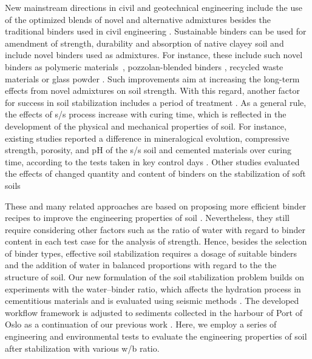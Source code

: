 \documentclass[sustainability,article,accept,pdftex,moreauthors]{Definitions/mdpi}
\begin{document}
New mainstream directions in civil and geotechnical engineering include the use of {the }optimized blends of novel and alternative admixtures besides {the }traditional binders used in {civil }engineering \cite{NAGY,Yi,Ismail,Lametal2018}. Sustainable binders can be used for amendment of strength, durability and absorption of native clayey soil and include novel binders used as admixtures{. For instance, these include such novel binders as} polymeric \mbox{materials \cite{geotechnics1020021,Moustafa,LIU2023101044},} pozzolan-blended binders \cite{Consoli}, recycled waste materials \cite{TABASSUM2022100880} or glass powder \cite{Filho}. Such improvements aim at increasing the long-term effects from novel admixtures on soil strength. With this regard, another factor for success in soil stabilization includes a period of treatment \cite{Howard,Romera}. As a general rule, the effects of s/s process increase with curing time, which is reflected in the development of the {physical and }mechanical properties of soil. For instance, existing studies reported a difference in mineralogical evolution, compressive strength, porosity, and pH of {the }s/s soil and cemented materials over curing time, according to the tests taken in key control days \cite{Chrysochoouetal2010,Shrestha}. {Other studies} evaluated{ }the effects of changed quantity and content of binders on the stabilization of soft soils \cite{Oliveiraetal2014,Oliveiraetal2013}

These and many related approaches are based on proposing more efficient binder recipes to improve {the }engineering properties of soil \cite{Khajeh,HUANG2022126702,Hallal}. {Nevertheless,} they still require considering other factors such as the ratio of water with regard to binder content in each test case for {the }analysis of strength. Hence, besides the selection of binder types,{ }effective soil stabilization requires a dosage of suitable binders and the addition of water in balanced proportions with regard to the the structure of soil. Our new formulation of the soil stabilization problem builds on experiments with the water--binder ratio, which affects the hydration process in cementitious materials and is evaluated using seismic methods \cite{Guoetal2021,CHI2021138699}. %
The developed workflow framework is adjusted to sediments collected in the harbour of Port of Oslo as a continuation of our previous work \cite{a16060303}. Here, we employ a series of engineering and environmental tests to evaluate the {engineering }properties {of} soil after stabilization with various w/b %
 ratio.
\end{document}
